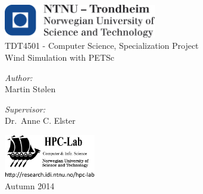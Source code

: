 \begin{titlepage}
\begin{center}

	\includegraphics[width=0.5\textwidth]{images/logo_ntnu_eng}~\\[1cm]

	{\large TDT4501 - Computer Science, Specialization Project}\\[0.3cm]

	{\huge Wind Simulation with PETSc}\\[1.5cm]

	\noindent
	\begin{minipage}{0.4\textwidth}
		\begin{flushleft}
		\emph{Author:}\\
		Martin Stølen
		\end{flushleft}
	\end{minipage}
	\begin{minipage}{0.4\textwidth}
		\begin{flushright}
		\emph{Supervisor:}\\
		Dr.~Anne C. Elster
		\end{flushright}
	\end{minipage}

	\vfill
	\includegraphics[width=0.3\textwidth]{images/hpc-lab-no-ntnu-logo}~\\[0.5cm]
	{Autumn 2014}

\end{center}
\end{titlepage}
